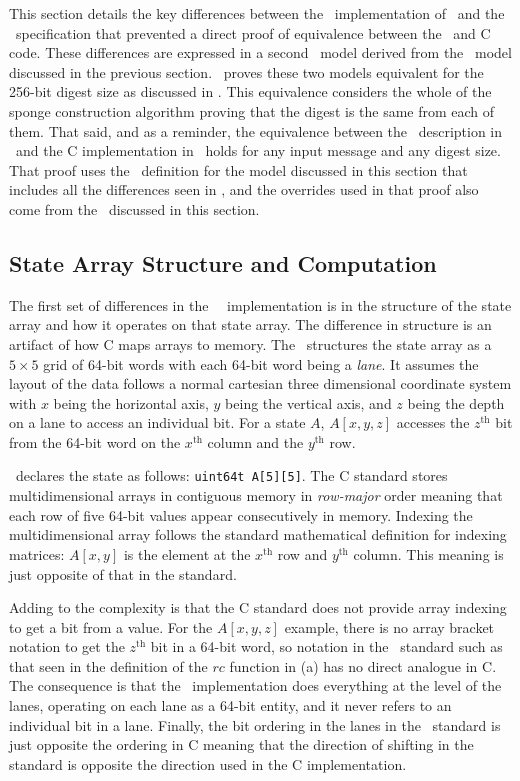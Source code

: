 This section details the key differences between the \openssl\ implementation of \shaThree\ and the \fips\ specification that prevented a direct proof of equivalence between the \cryptol\ and C code.
These differences are expressed in a second \cryptol\ model derived from the \fips\ model discussed in the previous section.
\saw\ proves these two models equivalent for the 256-bit digest size as discussed in .
This equivalence considers the whole of the sponge construction algorithm proving that the digest is the same from each of them.
That said, and as a reminder, the equivalence between the \keccak\ description in \cryptol\ and the C implementation in \openssl\ holds for any input message and any digest size.
That proof uses the \cryptol\ definition for the model discussed in this section that includes all the differences seen in \openssl, and the overrides used in that proof also come from the \cryptol\ discussed in this section.

\subsection{State Array Structure and Computation}

The first set of differences in the \openssl\ \shaThree\ implementation is in the structure of the state array and how it operates on that state array.
The difference in structure is an artifact of how C maps arrays to memory.
The \fips\ structures the state array as a $5 \times 5$ grid of 64-bit words with each 64-bit word being a \emph{lane}.
It assumes the layout of the data follows a normal cartesian three dimensional coordinate system with $x$ being the horizontal axis, $y$ being the vertical axis, and $z$ being the depth on a lane to access an individual bit.
For a state $A$, $A[x,y,z]$ accesses the $z^\mathrm{th}$ bit from the 64-bit word on the $x^\mathrm{th}$ column and the $y^\mathrm{th}$ row.

\openssl\ declares the state as follows: \texttt{uint64\textunderscore t A[5][5]}.
The C standard stores multidimensional arrays in contiguous memory in \emph{row-major} order meaning that each row of five 64-bit values appear consecutively in memory.
Indexing the multidimensional array follows the standard mathematical definition for indexing matrices: $A[x,y]$ is the element at the $x^\mathrm{th}$ row and $y^\mathrm{th}$ column.
This meaning is just opposite of that in the standard.

Adding to the complexity is that the C standard does not provide array indexing to get a bit from a value.
For the $A[x,y,z]$ example, there is no array bracket notation to get the $z^\mathrm{th}$ bit in a 64-bit word, so notation in the \fips\ standard such as that seen in the definition of the $rc$ function in (a) has no direct analogue in C.
The consequence is that the \openssl\ implementation does everything at the level of the lanes, operating on each lane as a 64-bit entity, and it never refers to an individual bit in a lane.
Finally, the bit ordering in the lanes in the \fips\ standard is just opposite the ordering in C meaning that the direction of shifting in the standard is opposite the direction used in the C implementation.

